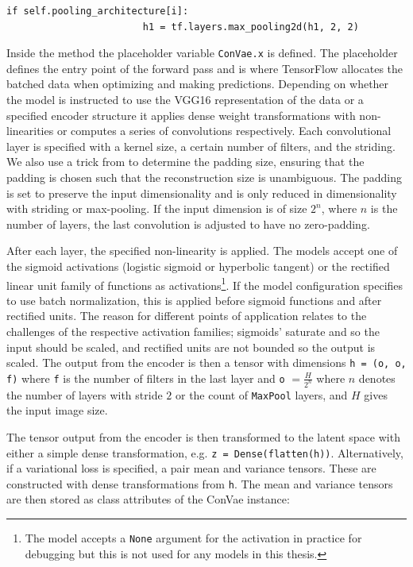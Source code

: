 \begin{lstlisting}[language=iPython]
                    if self.pooling_architecture[i]:
                        h1 = tf.layers.max_pooling2d(h1, 2, 2)

\end{lstlisting}

Inside the method the placeholder variable \lstinline{ConVae.x} is defined. The placeholder defines the entry point of the forward pass and is where TensorFlow allocates the batched data when optimizing and making predictions. Depending on whether the model is instructed to use the VGG16 representation of the data or a specified encoder structure it applies dense weight transformations with non-linearities or computes a series of convolutions respectively. Each convolutional layer is specified with a kernel size, a certain number of filters, and the striding. We also use a trick from \citet{Guo2017} to determine the padding size, ensuring that the padding is chosen such that the reconstruction size is unambiguous. The padding is set to preserve the input dimensionality and is only reduced in dimensionality with striding or max-pooling. If the input dimension is of size $2^n$, where $n$ is the number of layers, the last convolution is adjusted to have no zero-padding. 

After each layer, the specified non-linearity is applied. The models accept one of the sigmoid activations (logistic sigmoid or hyperbolic tangent) or the rectified linear unit family of functions as activations\footnote{The model accepts a \lstinline{None} argument for the activation in practice for debugging but this is not used for any models in this thesis.}. If the model configuration specifies to use batch normalization, this is applied before sigmoid functions and after rectified units. The reason for different points of application relates to the challenges of the respective activation families; sigmoids' saturate and so the input should be scaled, and rectified units are not bounded so the output is scaled. The output from the encoder is then a tensor with dimensions \lstinline{h = (o, o, f)} where \lstinline{f} is the number of filters in the last layer and \lstinline{o} $= \frac{H}{2^n}$ where $n$ denotes the number of layers with stride $2$ or the count of \lstinline{MaxPool} layers, and $H$ gives the input image size.

The tensor output from the encoder is then transformed to the latent space with either a simple dense transformation, e.g. \lstinline{z = Dense(flatten(h))}. Alternatively, if a variational loss is specified, a pair mean and variance tensors. These are constructed with dense transformations from \lstinline{h}. The mean and variance tensors are then stored as class attributes of the ConVae instance:

